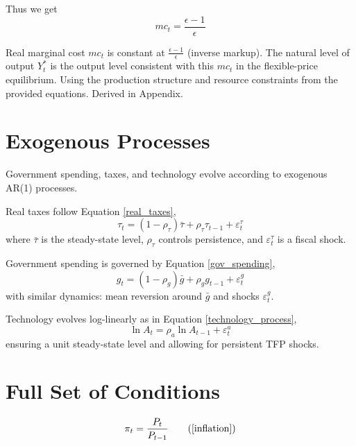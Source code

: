 \documentclass[11pt,preprint]{elsarticle}
\numberwithin{equation}{section}
\numberwithin{figure}{section}
\numberwithin{table}{section}
\begin{document}
Thus we get \begin{equation}
mc_t = \frac{\epsilon - 1}{\epsilon}
\end{equation}

Real marginal cost \(mc_t\) is constant at
\(\frac{\epsilon - 1}{\epsilon}\) (inverse markup). The natural level of
output \(Y_t^*\) is the output level consistent with this \(mc_t\) in
the flexible-price equilibrium. Using the production structure and
resource constraints from the provided equations. Derived in Appendix.

\section{Exogenous Processes}\label{exogenous-processes}

Government spending, taxes, and technology evolve according to exogenous
AR(1) processes.

Real taxes follow Equation \eqref{real_taxes}, \begin{equation}
\tau_t = (1-\rho_\tau)\bar{\tau} + \rho_\tau \tau_{t-1} + \varepsilon_t^\tau 
\label{real_taxes}
\end{equation} where \(\bar{\tau}\) is the steady-state level,
\(\rho_\tau\) controls persistence, and \(\varepsilon_t^\tau\) is a
fiscal shock.

Government spending is governed by Equation \eqref{gov_spending},
\begin{equation}
g_t = (1-\rho_g)\bar{g} + \rho_g g_{t-1} + \varepsilon_t^g 
\label{gov_spending}
\end{equation} with similar dynamics: mean reversion around \(\bar{g}\)
and shocks \(\varepsilon_t^g\).

Technology evolves log-linearly as in Equation
\eqref{technology_process}, \begin{equation}
\ln A_t = \rho_a \ln A_{t-1} + \varepsilon_t^a 
\label{technology_process}
\end{equation} ensuring a unit steady-state level and allowing for
persistent TFP shocks.

\newpage

\section{Full Set of Conditions}\label{full-set-of-conditions}

\begin{equation}
\pi_t = \frac{P_t}{P_{t-1}}
\tag{\ref{inflation}}
\end{equation}
\end{document}
